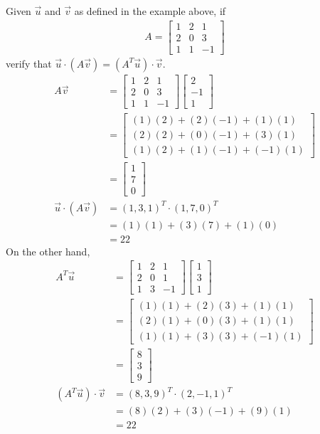 \begin{exmp}
Given $\vec{u}$ and $\vec{v}$ as defined in the example above, if
\begin{align*}
A =
\begin{bmatrix}
1 & 2 & 1 \\
2 & 0 & 3 \\
1 & 1 & -1
\end{bmatrix}
\end{align*}
verify that $\vec{u} \cdot (A\vec{v}) = (A^T\vec{u}) \cdot \vec{v}$.
\begin{align*}
A\vec{v} &= 
\begin{bmatrix}
1 & 2 & 1 \\
2 & 0 & 3 \\
1 & 1 & -1
\end{bmatrix}
\begin{bmatrix}
2 \\
-1 \\
1
\end{bmatrix} \\
&=
\begin{bmatrix}
(1)(2) + (2)(-1) + (1)(1) \\
(2)(2) + (0)(-1) + (3)(1) \\
(1)(2) + (1)(-1) + (-1)(1) 
\end{bmatrix} \\
&=
\begin{bmatrix}
1 \\
7 \\
0
\end{bmatrix} \\
\vec{u} \cdot (A\vec{v}) &= (1,3,1)^T \cdot (1,7,0)^T \\
&= (1)(1) + (3)(7) + (1)(0) \\
&= 22
\end{align*}
On the other hand,
\begin{align*}
A^T\vec{u} &= 
\begin{bmatrix}
1 & 2 & 1 \\
2 & 0 & 1 \\
1 & 3 & -1
\end{bmatrix}
\begin{bmatrix}
1 \\
3 \\
1
\end{bmatrix} \\
&=
\begin{bmatrix}
(1)(1) + (2)(3) + (1)(1) \\
(2)(1) + (0)(3) + (1)(1) \\
(1)(1) + (3)(3) + (-1)(1) 
\end{bmatrix} \\
&=
\begin{bmatrix}
8 \\
3 \\
9
\end{bmatrix} \\
(A^T\vec{u}) \cdot \vec{v} &= (8,3,9)^T \cdot (2,-1,1)^T \\
&= (8)(2) + (3)(-1) + (9)(1) \\
&= 22
\end{align*}
\end{exmp}


